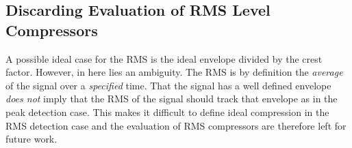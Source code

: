 \documentclass[../main2.tex]{subfiles}
\begin{document}
\subsection{Discarding Evaluation of RMS Level Compressors}\label{method_rms_compressors}
A possible ideal case for the RMS is the ideal envelope divided by the crest factor. However, in here lies an ambiguity. The RMS is by definition the \emph{average} of the signal over a \emph{specified} time. That the signal has a well defined envelope \emph{does not} imply that the RMS of the signal should track that envelope as in the peak detection case. 
This makes it difficult to define ideal compression in the RMS detection case and the evaluation of RMS compressors are therefore left for future work. 
\end{document}
